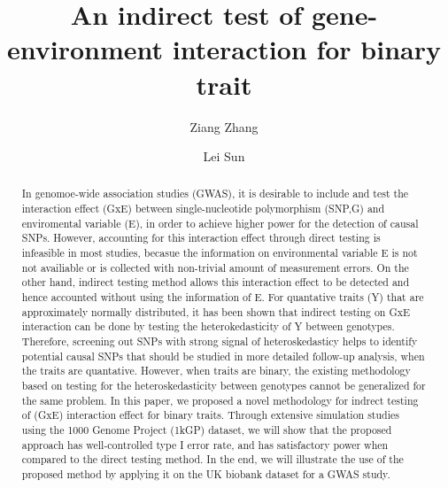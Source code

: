 \documentclass[12pt]{article}
\title{\textbf{An indirect test of gene-environment interaction for binary trait}}
\date{} 					%
\author[1]{Ziang Zhang}
\author[1, 2]{Lei Sun}
\affil[1]{Department of Statistical Science, University of Toronto, Ontario M5S 3G3, Canada}
\affil[2]{Division of Biostatistics, Dalla Lana School of Public Health, University of Toronto, Ontario M5T 3M7, Canada}
\begin{document}
\maketitle

\begin{abstract}
In genomoe-wide association studies (GWAS), it is desirable to include and test the interaction effect (GxE)  between single-nucleotide polymorphism (SNP,G) and enviromental variable (E), in order to achieve higher power for the detection of causal SNPs. However, accounting for this interaction effect through direct testing is infeasible in most studies, becasue the information on environmental variable E is not not availiable or is collected with non-trivial amount of measurement errors. On the other hand, indirect testing method allows this  interaction effect to be detected and hence accounted without using the information of E. For quantative traits (Y) that are approximately normally distributed, it has been shown that indirect testing on GxE interaction can be done by testing the heterokedasticity of Y between genotypes. 
Therefore, screening out SNPs with strong signal of heteroskedasticy helps to identify potential causal SNPs that should be studied in more detailed follow-up analysis, when the traits are quantative. However, when traits are binary, the existing methodology based on testing for the heteroskedasticity between genotypes cannot be generalized for the same problem. In this paper, we proposed a novel methodology for indrect testing of  (GxE)  interaction effect for binary traits. Through extensive simulation studies using the 1000 Genome Project (1kGP) dataset, we will show that the proposed approach has well-controlled type I error rate, and has satisfactory power when compared to the direct testing method. In the end, we will  illustrate the use of the proposed method by applying it on the UK biobank dataset for a GWAS study.
\end{abstract}

\doublespacing

\clearpage








\end{document}
